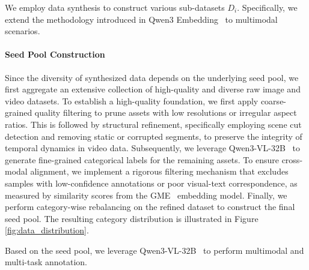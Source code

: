 \documentclass{article} %
\begin{document}
We employ data synthesis to construct various sub-datasets $D_i$. Specifically, we extend the methodology introduced in Qwen3 Embedding~\citep{qwen3embedding} to multimodal scenarios. 

\paragraph{Seed Pool Construction} Since the diversity of synthesized data depends on the underlying seed pool, we first aggregate an extensive collection of high-quality and diverse raw image and video datasets. To establish a high-quality foundation, we first apply coarse-grained quality filtering to prune assets with low resolutions or irregular aspect ratios. This is followed by structural refinement, specifically employing scene cut detection and removing static or corrupted segments, to preserve the integrity of temporal dynamics in video data. Subsequently, we leverage Qwen3-VL-32B~\citep{Qwen3-VL} to generate fine-grained categorical labels for the remaining assets. To ensure cross-modal alignment, we implement a rigorous filtering mechanism that excludes samples with low-confidence annotations or poor visual-text correspondence, as measured by similarity scores from the GME~\citep{zhang2025bridging} embedding model. Finally, we perform category-wise rebalancing on the refined dataset to construct the final seed pool. The resulting category distribution is illustrated in Figure \ref{fig:data_distribution}.

Based on the seed pool, we leverage Qwen3-VL-32B~\citep{Qwen3-VL} to perform multimodal and multi-task annotation. 
\end{document}
